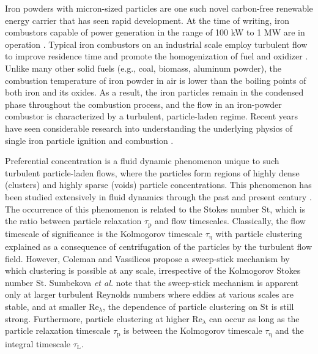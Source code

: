 \documentclass[times,twocolumn,final]{elsarticle}
\newcommand{\mrm}[1]{\mathrm{#1}}
\newcommand{\St}{\mathrm{St}}
\newcommand{\Rel}{\mathrm{Re}_\lambda}
\begin{document}
Iron powders with micron-sized particles are one such novel carbon-free renewable energy carrier that has seen rapid development. At the time of writing, iron combustors capable of power generation in the range of 100 kW to 1 MW are in operation \cite{metalot2025ironpower}. Typical iron combustors on an industrial scale employ turbulent flow to improve residence time and promote the homogenization of fuel and oxidizer \cite{niekvanrooijthesis,van20260}. Unlike many other solid fuels (e.g., coal, biomass, aluminum powder), the combustion temperature of iron powder in air is lower than the boiling points of both iron and its oxides. As a result, the iron particles remain in the condensed phase throughout the combustion process, and the flow in an iron-powder combustor is characterized by a turbulent, particle-laden regime. Recent years have seen considerable research into understanding the underlying physics of single iron particle ignition \cite{mi2025theoretical,st2026iron} and combustion \cite{Fujinawa2023,Thijs2022,Ning2021,Mich2023}.

Preferential concentration is a fluid dynamic phenomenon unique to such turbulent particle-laden flows, where the particles form regions of highly dense (clusters) and highly sparse (voids) particle concentrations. This phenomenon has been studied extensively in fluid dynamics through the past and present century \cite{Squires1991,Eaton1994,Coleman2009, Monchaux2012,Sumbekova}. The occurrence of this phenomenon is related to the Stokes number $\St$, which is the ratio between particle relaxation $\tau_\mrm{p}$ and flow timescales. Classically, the flow timescale of significance is the Kolmogorov timescale $\tau_\mrm{\eta}$ \cite{Eaton1994} with particle clustering explained as a consequence of centrifugation of the particles by the turbulent flow field. However, Coleman and Vassilicos \cite{Coleman2009} propose a sweep-stick mechanism by which clustering is possible at any scale, irrespective of the Kolmogorov Stokes number $\mrm{St}$. Sumbekova \emph{et al.} \cite{Sumbekova} note that the sweep-stick mechanism is apparent only at larger turbulent Reynolds numbers where eddies at various scales are stable, and at smaller $\Rel$, the dependence of particle clustering on $\St$ is still strong. Furthermore, particle clustering at higher $\Rel$ can occur as long as the particle relaxation timescale $\tau_\mrm{p}$ is between the Kolmogorov timescale $\tau_\mrm{\eta}$ and the integral timescale $\tau_\mrm{L}$.
\end{document}
